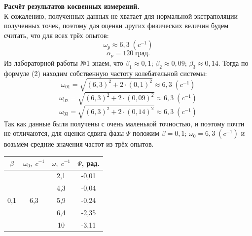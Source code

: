 \documentclass[a4paper]{article}
\begin{document}
{\parindent=0pt\textbf{Расчёт результатов косвенных измерений.}}\\
К сожалению, полученных данных не хватает для нормальной экстраполяции полученных точек, поэтому для оценки других физических величин будем считать, что для всех трёх опытов:
$$\omega_{p}\approx6,3\;(c^{-1})$$
$$\alpha_{p}=120\;\mbox{град.}$$
Из лабораторной работы №1 знаем, что $\beta_1 \approx 0,1$; $\beta_2 \approx 0,09$; $\beta_3 \approx 0,14$. Тогда по формуле (2) находим собственную частоту колебательной системы:
$$ \omega_{01}=\sqrt{(6,3)^2+2\cdot(0,1)^2}\approx6,3\;(c^{-1})$$
$$ \omega_{02}=\sqrt{(6,3)^2+2\cdot(0,09)^2}\approx6,3\;(c^{-1})$$
$$ \omega_{03}=\sqrt{(6,3)^2+2\cdot(0,14)^2}\approx6,3\;(c^{-1})$$
Так как данные были получены с очень маленькой точностью, и поэтому почти не отличаются, для оценки сдвига фазы $\Psi$ положим $\beta=0,1$; $\omega_0=6,3\;(c^{-1})$ и возьмём средние значения  частот из трёх опытов.

	\begin{center}
	\begin{tabular}{|c|c|c|c|}
	\hline
	$\beta$&$\omega_0,\;c^{-1}$&$\omega,\;c^{-1}$&$\Psi$, рад.  \\
			\hline
&  				&   2,1&-0,01\\

&  				&4,3   &-0,04\\

0,1& 6,3  &  5,9 &-0,24\\

&  				&  6,4&-2,35\\

&  				&  10 &-3,11\\
\hline
	\end{tabular}
	\end{center}

\begin{center}
\end{center}
\end{document}
